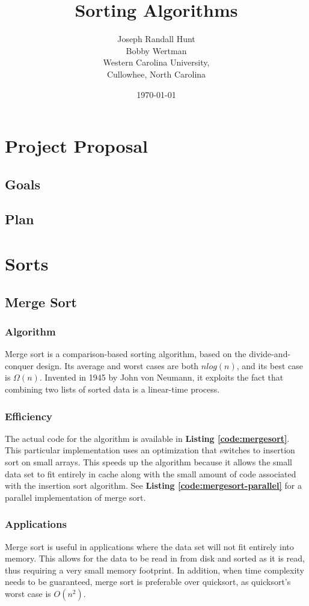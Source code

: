 \documentclass{article}
\title{Sorting Algorithms}
\author{Joseph Randall Hunt\\
Bobby Wertman\\
Western Carolina University,\\
Cullowhee, North Carolina\\
}
\date{\today}
\begin{document}
\maketitle
\section{Project Proposal}
   \subsection{Goals}
   \subsection{Plan}
\section{Sorts}
   \subsection{Merge Sort}
      \subsubsection{Algorithm}
        Merge sort is a comparison-based sorting algorithm, based on the
        divide-and-conquer design.  Its average and worst cases are both $n
        log(n)$, and its best case is $\Omega(n)$.  Invented in 1945 by John
        von Neumann, it exploits the fact that combining two lists of sorted
        data is a linear-time process.  \cite{introalg}
      \subsubsection{Efficiency}
        The actual code for the algorithm is available in \textbf{Listing
        \ref{code:mergesort}}.  This particular implementation uses an
        optimization that switches to insertion sort on small arrays.  This
        speeds up the algorithm because it allows the small data set to fit
        entirely in cache along with the small amount of code associated with
        the insertion sort algorithm.  See \textbf{Listing
        \ref{code:mergesort-parallel}} for a parallel implementation of merge
        sort.
      \subsubsection{Applications}
        Merge sort is useful in applications where the data set will not fit
        entirely into memory.  This allows for the data to be read in from disk
        and sorted as it is read, thus requiring a very small memory footprint.
        In addition, when time complexity needs to be guaranteed, merge sort is
        preferable over quicksort, as quicksort's worst case is $O(n^2)$.
\end{document}
